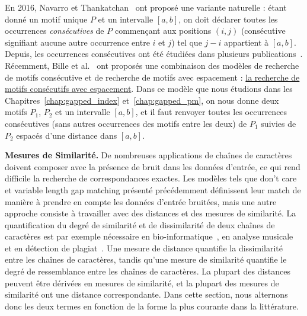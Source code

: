 En 2016, Navarro et Thankatchan~\cite{NAVARRO2016108} ont proposé une variante naturelle : étant donné un motif unique $P$ et un intervalle $[a,b]$, on doit déclarer toutes les occurrences \emph{consécutives} de $P$ commençant aux positions $(i,j)$ (consécutive signifiant aucune autre occurrence entre $i$ et $j$) tel que $j-i$ appartient à $[a,b]$. Depuis, les occurrences consécutives ont été étudiées dans plusieurs publications~\cite{DBLP:conf/fsttcs/BilleGPRS20,DBLP:journals/corr/abs-2304-00887,DBLP:journals/corr/abs-2211-16860}.
Récemment, Bille et al.~\cite{bille2022gapped} ont proposés une combinaison des modèles de recherche de motifs consécutive et de recherche de motifs avec espacement : \underline{la recherche de motifs consécutifs avec espacement}.
Dans ce modèle que nous étudions dans les Chapitres~\ref*{chap:gapped_index} et~\ref*{chap:gapped_pm}, on nous donne deux motifs $P_1$, $P_2$ et un intervalle $[a, b]$, et il faut renvoyer toutes les occurrences consécutives (sans autres occurrences des motifs entre les deux) de $P_1$ suivies de $P_2$ espacés d'une distance dans $[a, b]$. 



\noindent\textbf{Mesures de Similarité.} 
De nombreuses applications de chaînes de caractères doivent composer avec la présence de bruit dans les données d'entrée, ce qui rend difficile la recherche de correspondances exactes. Les modèles tels que don't care et variable length gap matching présenté précédemment définissent leur match de manière à prendre en compte les données d'entrée bruitées, mais une autre approche consiste à travailler avec des distances et des mesures de similarité. La quantification du degré de similarité et de dissimilarité de deux chaînes de caractères est par exemple nécessaire en bio-informatique~\cite{Gusfield1997}, en analyse musicale~\cite{Mongeau1990} et en détection de plagiat~\cite{lukashenko2007computer}. 
%
Une mesure de distance quantifie la dissimilarité entre les chaînes de caractères, tandis qu'une mesure de similarité quantifie le degré de ressemblance entre les chaînes de caractères. La plupart des distances peuvent être dérivées en mesures de similarité, et la plupart des mesures de similarité ont une distance correspondante. Dans cette section, nous alternons donc les deux termes en fonction de la forme la plus courante dans la littérature.

